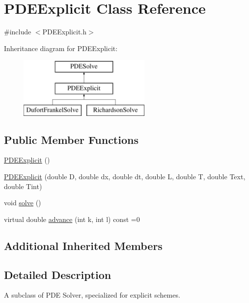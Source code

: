 \hypertarget{class_p_d_e_explicit}{}\section{P\+D\+E\+Explicit Class Reference}
\label{class_p_d_e_explicit}


{\ttfamily \#include $<$P\+D\+E\+Explicit.\+h$>$}

Inheritance diagram for P\+D\+E\+Explicit\+:\begin{figure}[H]
\begin{center}
\leavevmode
\includegraphics[height=3.000000cm]{class_p_d_e_explicit}
\end{center}
\end{figure}
\subsection*{Public Member Functions}
\begin{DoxyCompactItemize}
\item 
\hyperlink{class_p_d_e_explicit_a9adf9965c9e469d76b9d394128e4a5ea}{P\+D\+E\+Explicit} ()
\item 
\hyperlink{class_p_d_e_explicit_a8dd3f39d0a4d04a5b4ca0f8853f776f2}{P\+D\+E\+Explicit} (double D, double dx, double dt, double L, double T, double Text, double Tint)
\item 
void \hyperlink{class_p_d_e_explicit_a78282717c8230e9be65599865865e0c7}{solve} ()
\item 
virtual double \hyperlink{class_p_d_e_explicit_aed238f52510878474c02681904013dd3}{advance} (int k, int l) const =0
\end{DoxyCompactItemize}
\subsection*{Additional Inherited Members}


\subsection{Detailed Description}
A subclass of P\+DE Solver, specialized for explicit schemes.


